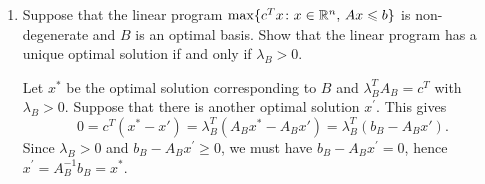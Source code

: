\documentclass[11pt]{article}
\newcommand{\setR}{\mathbb{R}}
\renewcommand{\leq}{\leqslant}
\renewcommand{\geq}{\geqslant}
\begin{document}
\begin{enumerate}[1)]
\begin{solution}
We show $\forall x_1 \neq x_2 \in P, x^\ast \neq \frac{1}{2}x_1 + \frac{1}{2}x_2 \implies $ $x^\ast$ is an extreme point. \\


Let $A_{x∗} $be the a set of valid inequalities for $P$ which
are tight at $x^∗$. If $rank(A_{x∗} ) < n$ then there exists a vector $d$ and $\epsilon ∈\setR>0$ such that $ad = 0$ for
any vector $a$ of $A_{x∗}$ and $x^\ast ±\epsilon d \in P$. Since $x^\ast=  1/2(x^\ast + \epsilon d) + 1/2(x^\ast
−\epsilon d)$ we have a contradiction. As this cannot hold, here exist $n$ linearly independent vectors that form the rows of some matrix $A$ such that each row is a valid inequality $a_i^T x = b_i$ for $P$ and $Ax^\ast = b$ at $x^\ast$. Let $c= 1^T A$. Then $x^\ast$ is the unique point x such that $cx= 1^T b$ and $Ax≤b$. Thus $x^\ast$ is an extreme point.

\end{solution}


\item Suppose that the linear program $\max \{c^Tx \colon x \in \R^n, \, Ax \leq b\}$ is non-degenerate and $B$ is an optimal basis. Show that the linear program has a unique optimal solution if and only if $\lambda_B>0$. 


\begin{solution}
Let $x^*$ be the optimal solution corresponding to $B$ and $\lambda_B^TA_B = c^T$ with $\lambda_B>0$. Suppose that there is another optimal solution $x^\prime$. This gives
$$0 = c^T(x^*-x') = \lambda_B^T(A_B x^* - A_Bx') = \lambda_B^T(b_B - A_Bx').$$
Since $\lambda_B> 0$ and $b_B - A_B x^\prime \geq 0$, we must have $b_B - A_B x^\prime = 0$, hence $x^\prime = A_B^{-1} b_B = x^*$.



\end{solution}
\end{enumerate}
\end{document}
